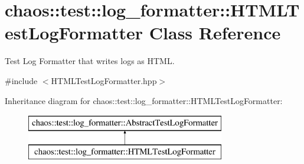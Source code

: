 \hypertarget{classchaos_1_1test_1_1log__formatter_1_1_h_t_m_l_test_log_formatter}{}\section{chaos\+:\+:test\+:\+:log\+\_\+formatter\+:\+:H\+T\+M\+L\+Test\+Log\+Formatter Class Reference}
\label{classchaos_1_1test_1_1log__formatter_1_1_h_t_m_l_test_log_formatter}


Test Log Formatter that writes logs as H\+T\+M\+L.  




{\ttfamily \#include $<$H\+T\+M\+L\+Test\+Log\+Formatter.\+hpp$>$}

Inheritance diagram for chaos\+:\+:test\+:\+:log\+\_\+formatter\+:\+:H\+T\+M\+L\+Test\+Log\+Formatter\+:\begin{figure}[H]
\begin{center}
\leavevmode
\includegraphics[height=2.000000cm]{classchaos_1_1test_1_1log__formatter_1_1_h_t_m_l_test_log_formatter}
\end{center}
\end{figure}
